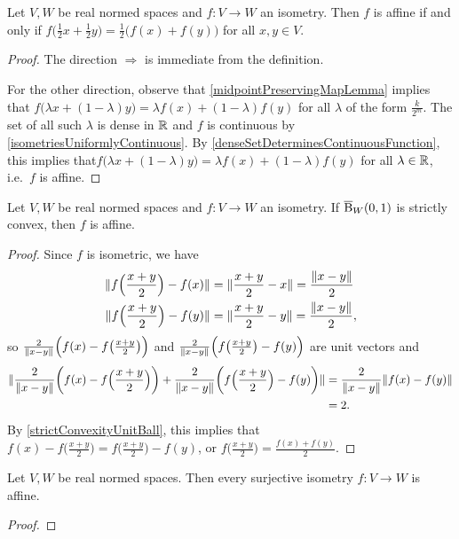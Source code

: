 \begin{proposition}
Let $V,W$ be real normed spaces and $f: V\to W$ an isometry. Then $f$ is affine \textup{if and only if} $f\big(\frac{1}{2}x + \frac{1}{2}y\big) = \frac{1}{2}\big(f(x) + f(y)\big)$ for all $x,y\in V$.
\end{proposition}
\begin{proof}
The direction $\Rightarrow$ is immediate from the definition.

For the other direction, observe that \ref{midpointPreservingMapLemma} implies that $f\big(\lambda x + (1-\lambda)y\big) = \lambda f(x) + (1-\lambda)f(y)$ for all $\lambda$ of the form $\frac{k}{2^m}$. The set of all such $\lambda$ is dense in $\mathbb{R}$ and $f$ is continuous by \ref{isometriesUniformlyContinuous}. By \ref{denseSetDeterminesContinuousFunction}, this implies that$f\big(\lambda x + (1-\lambda)y\big) = \lambda f(x) + (1-\lambda)f(y)$ for all $\lambda\in\mathbb{R}$, i.e.\ $f$ is affine.
\end{proof}
\begin{corollary}
Let $V,W$ be real normed spaces and $f: V\to W$ an isometry. If $\operatorname{\overline{B}}_W(0,1)$ is strictly convex, then $f$ is affine.
\end{corollary}
\begin{proof}
Since $f$ is isometric, we have
\begin{align*}
\lVert f\Big(\frac{x+y}{2}\Big) - f(x)\rVert &= \lVert\frac{x+y}{2} - x\rVert = \frac{\lVert x-y\rVert}{2} \\
\lVert f\Big(\frac{x+y}{2}\Big) - f(y)\rVert &= \lVert\frac{x+y}{2} - y\rVert = \frac{\lVert x-y\rVert}{2}, 
\end{align*}
so $\frac{2}{\lVert x-y\rVert}\Big(f(x) - f\big(\frac{x+y}{2}\big)\Big)$ and $\frac{2}{\lVert x-y\rVert}\Big(f\big(\frac{x+y}{2}\big) - f(y)\Big)$ are unit vectors and 
\begin{align*}
\lVert\frac{2}{\lVert x-y\rVert}\bigg(f(x) - f\Big(\frac{x+y}{2}\Big)\bigg) + \frac{2}{\lVert x-y\rVert}\bigg(f\Big(\frac{x+y}{2}\Big) - f(y)\bigg)\rVert &= \frac{2}{\lVert x-y\rVert}\lVert f(x) - f(y)\rVert \\
&= 2.
\end{align*}
By \ref{strictConvexityUnitBall}, this implies that $f(x) - f\big(\frac{x+y}{2}\big) = f\big(\frac{x+y}{2}\big) - f(y)$, or $f\big(\frac{x+y}{2}\big) = \frac{f(x) + f(y)}{2}$.
\end{proof}

\begin{theorem}
Let $V,W$ be real normed spaces. Then every surjective isometry $f: V\to W$ is affine.
\end{theorem}
\begin{proof}

\end{proof}

